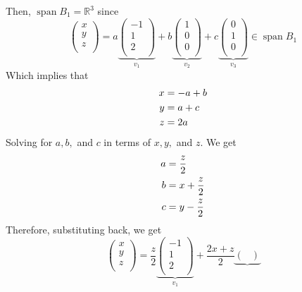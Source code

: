 \documentclass[12pt]{article}
\newcommand{\R}{\mathbb{R}}
\begin{document}
\begin{enumerate}
    Then, $\operatorname{span}B_1 = \R^3$ since
    $$\begin{pmatrix}
            x \\ y \\ z \\ 
        \end{pmatrix} = a \underbrace{
        \begin{pmatrix}
            -1 \\ 1 \\ 2 \\ 
        \end{pmatrix}
    }_{v_1}
    + b
    \underbrace{
        \begin{pmatrix}
            1 \\ 0 \\ 0 \\ 
        \end{pmatrix}
    }_{v_2}
    + c
    \underbrace{
        \begin{pmatrix}
            0 \\ 1 \\ 0 \\ 
        \end{pmatrix}
    }_{v_3} 
    \in \operatorname{span}B_1
    $$
    Which implies that 
    \begin{align}x &= -a + b\notag\\ y &= a + c \notag\\ z &= 2a\notag\end{align} 
     Solving for $a,b,$ and $c$ in terms of $x, y,$ and $z$. We get
    \begin{align}a &= \frac{z}{2} \notag\\ b &= x + \frac{z}{2} \notag\\ c &= y - \frac{z}{2}\notag\end{align}
    Therefore, substituting back, we get
    $$\begin{pmatrix}
            x \\ y \\ z \\ 
        \end{pmatrix} = \frac{z}{2} \underbrace{
        \begin{pmatrix}
            -1 \\ 1 \\ 2 \\ 
        \end{pmatrix}
    }_{v_1}
    + \frac{2x+z}{2}
    \underbrace{
        \begin{pmatrix}

\end{pmatrix}}$$
\end{enumerate}
\end{document}
